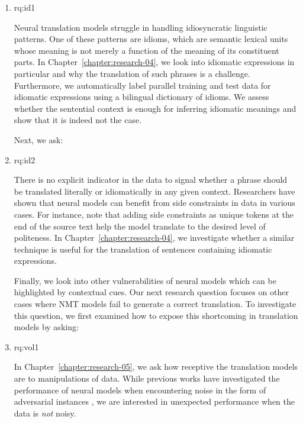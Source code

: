\begin{enumerate}[label=\textbf{Research Question \arabic*:},ref={RQ\arabic*},wide = 0pt,resume]
\begin{enumerate}[label=\textbf{RQ3.\arabic*},wide = 0pt, leftmargin=2em]
\setlength\itemsep{1em}
\item \acl{rq:id1} \label{rq:id1}

\medskip

Neural translation models struggle in handling idiosyncratic linguistic patterns. 
One of these patterns are idioms, which are semantic lexical units whose meaning is not merely a function of the meaning of its constituent parts.
In Chapter~\ref{chapter:research-04}, we look into idiomatic expressions in particular and why the translation of such phrases is a challenge. 
Furthermore, we automatically label parallel training and test data for idiomatic expressions using a bilingual dictionary of idioms.
We assess whether the sentential context is enough for inferring idiomatic meanings and show that it is indeed not the case.

Next, we ask:

\item \acl{rq:id2} \label{rq:id2}

\medskip

There is no explicit indicator in the data to signal whether a phrase should be translated literally or idiomatically in any given context. 
Researchers have shown that neural models can benefit from side constraints in data in various cases. For instance, 
\citet{sennrich-etal-2016-controlling} note that adding side constraints as unique tokens at the end of the source text help the model translate to the desired level of politeness. 
In Chapter~\ref{chapter:research-04}, we investigate whether a similar technique is useful for the translation of sentences containing idiomatic expressions. 

\medskip

\noindent Finally, we look into other vulnerabilities of neural models which can be highlighted by contextual cues. 
Our next research question focuses on other cases where NMT models fail to generate a correct translation. 
To investigate this question, we first examined how to expose this shortcoming in translation models by asking:  

\item \acl{rq:vol1} \label{rq:vol1}

\medskip

In Chapter~\ref{chapter:research-05}, we ask how receptive the translation models are to manipulations of data. While previous works have investigated the performance of neural models when encountering noise in the form of adversarial instances \citep{goodfellow6572explaining,D18-1050,DBLP:journals/corr/abs-1711-02173}, we are interested in unexpected performance when the data is \textit{not} noisy.


\end{enumerate}
\end{enumerate}
